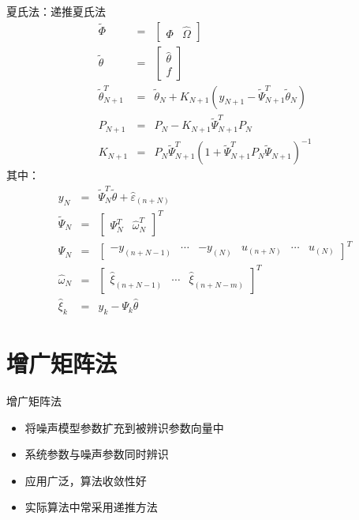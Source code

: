 \begin{frame}{夏氏法：递推夏氏法}
\begin{eqnarray*}
\tilde\Phi &=&\begin{bmatrix}\Phi & \hat\Omega\end{bmatrix} \\
\tilde\theta &=&\begin{bmatrix}\hat\theta \\ f \end{bmatrix} \\
\tilde\theta_{N+1}^T &=& \tilde\theta_N + K_{N+1} (y_{N+1}-\tilde\Psi_{N+1}^T\tilde\theta_N) \\
P_{N+1} &=& P_N -K_{N+1}\tilde\Psi_{N+1}^T P_N \\
K_{N+1} &=& P_N \tilde\Psi_{N+1}^T (1+\tilde\Psi_{N+1}^T P_N \tilde\Psi_{N+1})^{-1}
\end{eqnarray*}
其中：
\begin{eqnarray*}
y_{N} &=& \tilde \Psi_N^T\tilde\theta + \hat\varepsilon_{(n+N)} \\
\tilde\Psi_N &=&\begin{bmatrix}\Psi_N^T & \hat\omega_N^T \end{bmatrix}^T \\
\Psi_N &=& \begin{bmatrix} -y_{(n+N-1)} & \cdots & -y_{(N)} & u_{(n+N)} &\cdots & u_{(N)} \end{bmatrix}^T \\
\hat\omega_N &=&\begin{bmatrix} \hat\xi_{(n+N-1)} & \cdots & \hat\xi_{(n+N-m)} \end{bmatrix}^T \\
\hat\xi_k &=& y_k-\Psi_k \hat\theta
\end{eqnarray*}
\end{frame}

\section{增广矩阵法}
\begin{frame}{增广矩阵法}
\begin{itemize}
\item  将噪声模型参数扩充到被辨识参数向量中
\item  系统参数与噪声参数同时辨识
\item  应用广泛，算法收敛性好
\item  实际算法中常采用递推方法
\end{itemize}
\end{frame}

